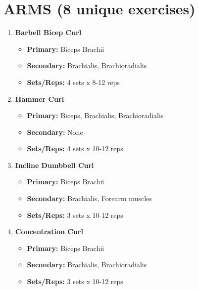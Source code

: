 \documentclass{article}
\begin{document}
\section*{ARMS (8 unique exercises)}
\begin{enumerate}[label=\arabic*., wide=0pt, leftmargin=*]
    \item \textbf{Barbell Bicep Curl}
        \begin{itemize}[label=\textbullet, leftmargin=*, nosep, topsep=0pt, partopsep=0pt]
            \item \textbf{Primary:} Biceps Brachii
            \item \textbf{Secondary:} Brachialis, Brachioradialis
            \item \textbf{Sets/Reps:} 4 sets x 8-12 reps
        \end{itemize}

    \item \textbf{Hammer Curl}
        \begin{itemize}[label=\textbullet, leftmargin=*, nosep, topsep=0pt, partopsep=0pt]
            \item \textbf{Primary:} Biceps, Brachialis, Brachioradialis
            \item \textbf{Secondary:} None
            \item \textbf{Sets/Reps:} 4 sets x 10-12 reps
        \end{itemize}

    \item \textbf{Incline Dumbbell Curl}
        \begin{itemize}[label=\textbullet, leftmargin=*, nosep, topsep=0pt, partopsep=0pt]
            \item \textbf{Primary:} Biceps Brachii
            \item \textbf{Secondary:} Brachialis, Forearm muscles
            \item \textbf{Sets/Reps:} 3 sets x 10-12 reps
        \end{itemize}

    \item \textbf{Concentration Curl}
        \begin{itemize}[label=\textbullet, leftmargin=*, nosep, topsep=0pt, partopsep=0pt]
            \item \textbf{Primary:} Biceps Brachii
            \item \textbf{Secondary:} Brachialis, Brachioradialis
            \item \textbf{Sets/Reps:} 3 sets x 10-12 reps
        \end{itemize}


\end{enumerate}
\end{document}
